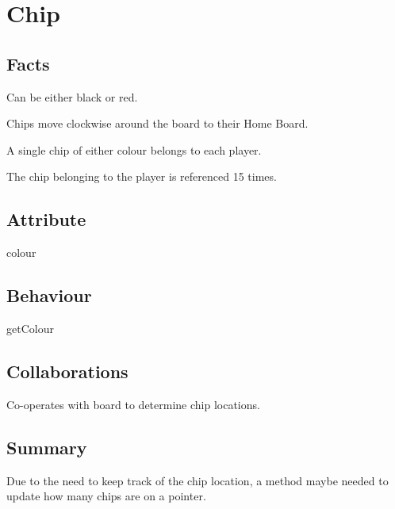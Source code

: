 \section{Chip}

\subsection{Facts}
\begin{dashed}
    \item Can be either black or red.
    \item Chips move clockwise around the board to their Home Board.
    \item A single chip of either colour belongs to each player.
    \item The chip belonging to the player is referenced 15 times.
\end{dashed}


\subsection{Attribute}
\begin{dashed}
    \item colour
\end{dashed}

\subsection{Behaviour}
\begin{dashed}
    \item getColour
\end{dashed}

\subsection{Collaborations}
\begin{dashed}
    \item Co-operates with board to determine chip locations.
\end{dashed}

\subsection{Summary}
Due to the need to keep track of the chip location, a method maybe needed to update how many chips
are on a pointer.
